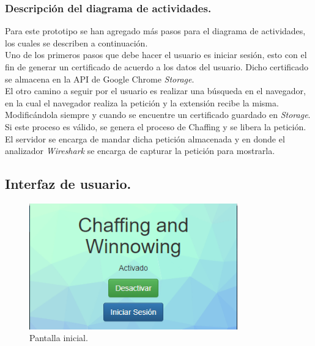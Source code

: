 \documentclass[12pt, a4paper, titlepage]{report}
\begin{document}
        		\subsubsection{Descripción del diagrama de actividades.}
        		Para este prototipo se han agregado más pasos para el diagrama de actividades, los cuales se describen a 
            	continuación.\\
            	Uno de los primeros pasos que debe hacer el usuario es iniciar sesión, esto con el fin de generar un certificado de acuerdo a los datos del usuario. Dicho certificado se almacena en la API de Google Chrome \textit{Storage}. \\
            	El otro camino a seguir por el usuario es realizar una búsqueda en el navegador, en la cual el navegador realiza la petición y la extensión recibe la misma. Modificándola siempre y cuando se encuentre un certificado guardado en \textit{Storage}. Si este proceso es válido, se genera el proceso de Chaffing y se libera la petición. El servidor se encarga de mandar dicha petición almacenada y en donde el analizador \textit{Wireshark} se encarga de capturar la petición para mostrarla.
			
    		\subsection{Interfaz de usuario.}
    
    		    \begin{figure}[H]
    				\begin{center}	\includegraphics[width=9cm]{./imagenes/Desarrollo/Prototipo_2/UI_inicio.PNG}
    					\caption{Pantalla inicial.}
    				\end{center}
    			\end{figure}
    			  
\end{document}
